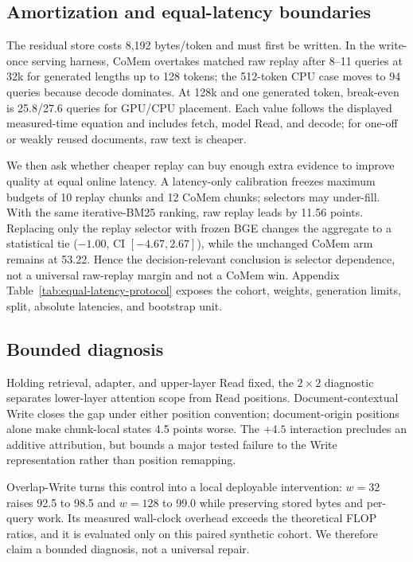 \subsection{Amortization and equal-latency boundaries}


The residual store costs 8,192 bytes/token and must first be written. In the
write-once serving harness, CoMem overtakes matched raw replay after 8--11
queries at 32k for generated lengths up to 128 tokens; the 512-token CPU case
moves to 94 queries because decode dominates. At 128k and one generated token,
break-even is 25.8/27.6 queries for GPU/CPU placement. Each value follows the
displayed measured-time equation and includes fetch, model Read, and decode;
for one-off or weakly reused documents, raw text is cheaper.



We then ask whether cheaper replay can buy enough extra evidence to improve
quality at equal online latency. A latency-only calibration freezes maximum
budgets of 10 replay chunks and 12 CoMem chunks; selectors may under-fill.
With the same iterative-BM25 ranking, raw replay
leads by 11.56 points. Replacing only the replay selector with frozen BGE changes
the aggregate to a statistical tie ($-1.00$, CI $[-4.67,2.67]$), while the
unchanged CoMem arm remains at 53.22. Hence the decision-relevant conclusion is
selector dependence, not a universal raw-replay margin and not a CoMem win.
Appendix Table~\ref{tab:equal-latency-protocol} exposes the cohort, weights,
generation limits, split, absolute latencies, and bootstrap unit.

\subsection{Bounded diagnosis}



Holding retrieval, adapter, and upper-layer Read fixed, the $2{\times}2$
diagnostic separates lower-layer attention scope from Read positions.
Document-contextual Write closes the gap under either position convention;
document-origin positions alone make chunk-local states 4.5 points worse. The
$+4.5$ interaction precludes an additive attribution, but bounds a major tested
failure to the Write representation rather than position remapping.

Overlap-Write turns this control into a local deployable intervention:
$w{=}32$ raises 92.5 to 98.5 and $w{=}128$ to 99.0 while preserving stored
bytes and per-query work. Its measured wall-clock overhead exceeds the
theoretical FLOP ratios, and it is evaluated only on this paired synthetic
cohort. We therefore claim a bounded diagnosis, not a universal repair.


